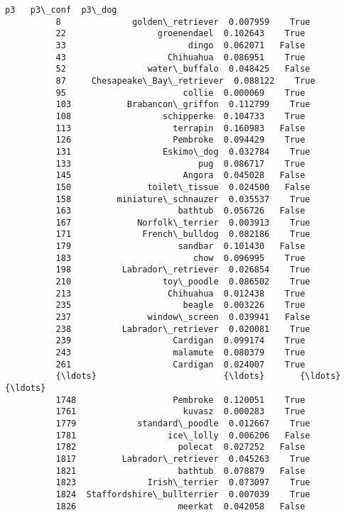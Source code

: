 \documentclass[11pt]{article}
\begin{document}
\begin{Verbatim}[commandchars=\\\{\}]
                                       p3   p3\_conf  p3\_dog  
          8              golden\_retriever  0.007959    True  
          22                  groenendael  0.102643    True  
          33                        dingo  0.062071   False  
          43                    Chihuahua  0.086951    True  
          52                water\_buffalo  0.048425   False  
          87     Chesapeake\_Bay\_retriever  0.088122    True  
          95                       collie  0.000069    True  
          103           Brabancon\_griffon  0.112799    True  
          108                  schipperke  0.104733    True  
          113                    terrapin  0.160983   False  
          126                    Pembroke  0.094429    True  
          131                  Eskimo\_dog  0.032784    True  
          133                         pug  0.086717    True  
          145                      Angora  0.045028   False  
          150               toilet\_tissue  0.024500   False  
          158         miniature\_schnauzer  0.035537    True  
          163                     bathtub  0.056726   False  
          167             Norfolk\_terrier  0.003913    True  
          171              French\_bulldog  0.082186    True  
          179                     sandbar  0.101430   False  
          183                        chow  0.096995    True  
          198          Labrador\_retriever  0.026854    True  
          210                  toy\_poodle  0.086502    True  
          213                   Chihuahua  0.012438    True  
          235                      beagle  0.003226    True  
          237               window\_screen  0.039941   False  
          238          Labrador\_retriever  0.020081    True  
          239                    Cardigan  0.099174    True  
          243                    malamute  0.080379    True  
          261                    Cardigan  0.024007    True  
          {\ldots}                         {\ldots}       {\ldots}     {\ldots}  
          1748                   Pembroke  0.120051    True  
          1761                     kuvasz  0.000283    True  
          1779            standard\_poodle  0.012667    True  
          1781                  ice\_lolly  0.006206   False  
          1782                    polecat  0.027252   False  
          1817         Labrador\_retriever  0.045263    True  
          1821                    bathtub  0.078879   False  
          1823              Irish\_terrier  0.073097    True  
          1824  Staffordshire\_bullterrier  0.007039    True  
          1826                    meerkat  0.042058   False  

\end{Verbatim}
\end{document}
